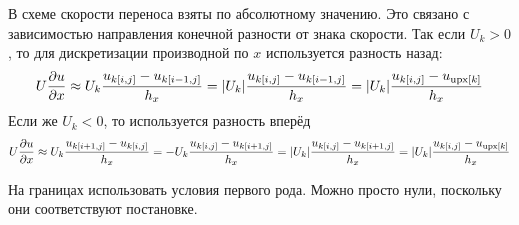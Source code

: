 В схеме скорости переноса взяты по абсолютному значению.
Это связано с зависимостью направления конечной разности от знака скорости.
Так если $U_k > 0$, то для дискретизации производной по $x$ используется разность
назад:
\begin{equation*}
    U\frac{\partial u}{\partial x} \approx U_k\frac{u_{k[i, j]} - u_{k[i-1, j]}}{h_x}
    = |U_k|\frac{u_{k[i, j]} - u_{k[i-1, j]}}{h_x}
    = |U_k|\frac{u_{k[i, j]} - u_{\mathrm{upx}\left[k\right]}}{h_x}
\end{equation*}
Если же $U_k < 0$, то используется разность вперёд
\begin{equation*}
    U\frac{\partial u}{\partial x} \approx U_k\frac{u_{k[i+1, j]} - u_{k[i, j]}}{h_x}
    = -U_k\frac{u_{k[i, j]} - u_{k[i+1, j]}}{h_x} 
    = |U_k|\frac{u_{k[i, j]} - u_{k[i+1, j]}}{h_x} 
    = |U_k|\frac{u_{k[i, j]} - u_{\mathrm{upx}\left[k\right]}}{h_x} 
\end{equation*}

На границах использовать условия первого рода. Можно просто нули, поскольку они соответствуют постановке.
